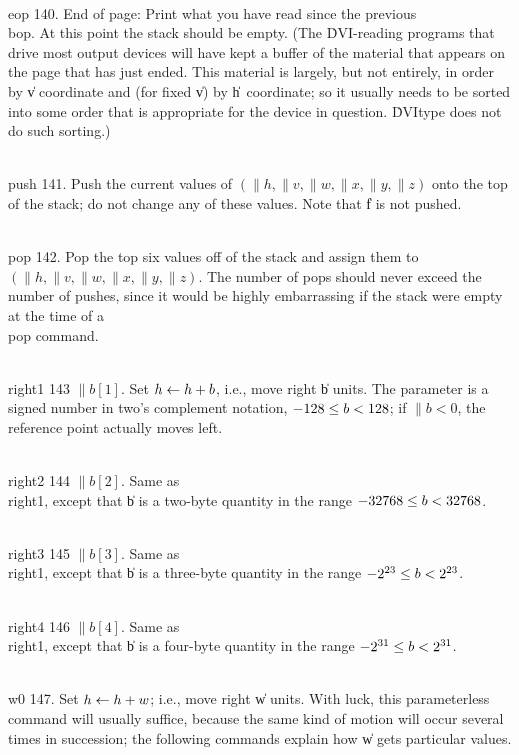 \yskip\hang\\{eop} 140.  End of page: Print what you have read since the
previous \\{bop}. At this point the stack should be empty. (The \.{DVI}-reading
programs that drive most output devices will have kept a buffer of the
material that appears on the page that has just ended. This material is
largely, but not entirely, in order by \|v coordinate and (for fixed \|v) by
\|h~coordinate; so it usually needs to be sorted into some order that is
appropriate for the device in question. \.{DVItype} does not do such sorting.)

\yskip\hang\\{push} 141. Push the current values of $(\|h,\|v,\|w,\|x,\|y,\|z)$
onto the
top of the stack; do not change any of these values. Note that \|f is
not pushed.

\yskip\hang\\{pop} 142. Pop the top six values off of the stack and assign
them to $(\|h,\|v,\|w,\|x,\|y,\|z)$. The number of pops should never exceed the
number
of pushes, since it would be highly embarrassing if the stack were empty
at the time of a \\{pop} command.

\yskip\hang\\{right1} 143 $\|b[1]$. Set $\hbox{$h$}\gets\hbox{$h$}+\hbox{$b$}$, i.e., move right \|b
units.
The parameter is a signed number in two's complement notation, $-128\le\hbox{$b$}<128$;
if $\|b<0$, the reference point actually moves left.

\yskip\hang\\{right2} 144 $\|b[2]$. Same as \\{right1}, except that \|b is a
two-byte quantity in the range $-32768\le\hbox{$b$}<32768$.

\yskip\hang\\{right3} 145 $\|b[3]$. Same as \\{right1}, except that \|b is a
three-byte quantity in the range $\hbox{$-2^{23}$}\le\hbox{$b$}<\hbox{$2^{23}$}$.

\yskip\hang\\{right4} 146 $\|b[4]$. Same as \\{right1}, except that \|b is a
four-byte quantity in the range $\hbox{$-2^{31}$}\le\hbox{$b$}<\hbox{$2^{31}$}$.

\yskip\hang\\{w0} 147. Set $\hbox{$h$}\gets\hbox{$h$}+\hbox{$w$}$; i.e., move right \|w units. With
luck,
this parameterless command will usually suffice, because the same kind of
motion
will occur several times in succession; the following commands explain how
\|w gets particular values.


